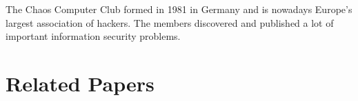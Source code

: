 The Chaos Computer Club formed in 1981 in Germany and is nowadays Europe's largest association of hackers. The members discovered and published a lot of important information security problems. 




\section{Related Papers}
\label{sec:related}


